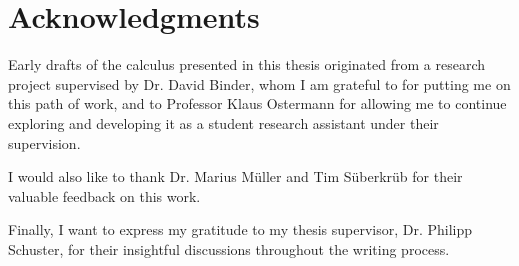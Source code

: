 
\begingroup
\let\clearpage\relax
\let\cleardoublepage\relax
\let\cleardoublepage\relax
\chapter*{Acknowledgments}
Early drafts of the calculus presented in this thesis originated from a research
project supervised by Dr. David Binder, whom I am grateful to for putting me on
this path of work, and to Professor Klaus Ostermann for allowing me to continue
exploring and developing it as a student research assistant under their supervision.

I would also like to thank Dr. Marius Müller and Tim Süberkrüb
for their valuable feedback on this work.

Finally, I want to express my gratitude to my thesis supervisor, Dr. Philipp Schuster,
for their insightful discussions throughout the writing process.

\endgroup



